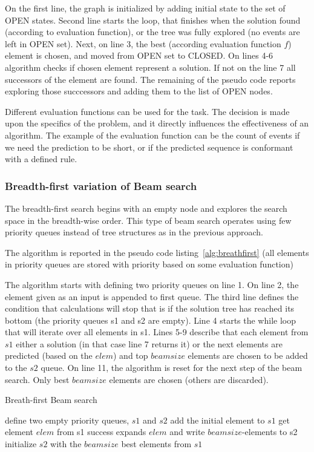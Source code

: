 On the first line, the graph is initialized by adding initial state to the set of OPEN states. 
Second line starts the loop, that finishes when the solution found (according to evaluation function), or the tree was fully explored (no events are left in OPEN set). Next, on line 3, the best (according evaluation function $f$) element is chosen, and moved from OPEN set to CLOSED. On lines 4-6 algorithm checks if chosen element represent a solution. If not on the line 7 all successors of the element are found. The remaining of the pseudo code reports exploring those succcessors and adding them to the list of OPEN nodes. 

Different evaluation functions can be used for the task. The decision is made upon the specifics of the problem, and it directly influences the effectiveness of an algorithm. The example of the evaluation function can be the count of events if we need the prediction to be short, or if the predicted sequence is conformant with a defined rule.

\subsubsection{Breadth-first variation of Beam search}

The breadth-first search begins with an empty node and explores the search space in the breadth-wise order. This type of beam search operates using few priority queues instead of tree structures as in the previous approach. 

The algorithm is reported in the pseudo code listing~\ref{alg:breathfirst} (all elements in priority queues are stored with priority based on some evaluation function)

The algorithm starts with defining two priority queues on line 1. On line 2, the element given as an input is appended to first queue. The third line defines the condition that calculations will stop that is if the solution tree has reached its bottom (the priority queues s1 and s2 are empty). Line 4 starts the while loop that will iterate over all elements in s1. Lines 5-9 describe that each element from $s1$ either a solution (in that case line 7 returns it) or the next elements are predicted (based on the $elem$) and top $beamsize$ elements are chosen to be added to the $s2$ queue. On line 11, the algorithm is reset for the next step of the beam search. Only best $beamsize$ elements are chosen (others are discarded).


\begin{algorithm}
 	\caption{Breath-first Beam search}
	\label{alg:breathfirst}
	\begin{algorithmic}[1]
		\State define two empty priority queues, $s1$ and $s2$
		\State add the initial element to $s1$
				\State get element $elem$ from s1
					\State	success
					\EndIf
					\State expands $elem$ and write $beamsize$-elements to s2
					\EndWhile
					\State initialize $s2$ with the $beamsize$ best elements from $s1$
					\EndWhile
	\end{algorithmic}
\end{algorithm}




